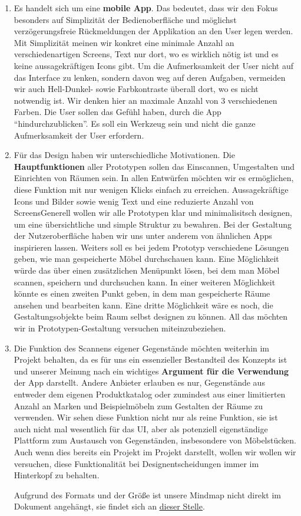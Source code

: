 \documentclass[12pt,paper=a4,oneside,hidelinks,headings=small,captions=heading,captions=nooneline]{scrartcl}
\begin{document}
\begin{enumerate}
\item Es handelt sich um eine \textbf{mobile App}. Das bedeutet, dass wir den
Fokus besonders auf Simplizität der Bedienoberfläche und möglichst
verzögerungsfreie Rückmeldungen der Applikation an den User legen
werden. Mit Simplizität meinen wir konkret eine minimale Anzahl an
verschiedenartigen Screens, Text nur dort, wo es wirklich nötig ist
und es keine aussagekräftigen Icons gibt. Um die Aufmerksamkeit der
User nicht auf das Interface zu lenken, sondern davon weg auf deren
Aufgaben, vermeiden wir auch Hell-Dunkel- sowie Farbkontraste
überall dort, wo es nicht notwendig ist. Wir denken hier an
maximale Anzahl von 3 verschiedenen Farben. Die User sollen das
Gefühl haben, durch die App "`hindurchzublicken"'. Es soll ein
Werkzeug sein und nicht die ganze Aufmerksamkeit der User
erfordern.
\item Für das Design haben wir unterschiedliche Motivationen. Die
\textbf{Hauptfunktionen} aller Prototypen sollen das Einscannen,
Umgestalten und Einrichten von Räumen sein. In allen Entwürfen
möchten wir es ermöglichen, diese Funktion mit nur wenigen Klicks
einfach zu erreichen. Aussagekräftige Icons und Bilder sowie wenig
Text und eine reduzierte Anzahl von ScreensGenerell wollen wir
alle Prototypen klar und minimalisitsch designen, um eine
übersichtliche und simple Struktur zu bewahren. Bei der Gestaltung
der Nutzeroberfläche haben wir uns unter anderem von ähnlichen Apps
inspirieren lassen. Weiters soll es bei jedem Prototyp verschiedene
Lösungen geben, wie man gespeicherte Möbel durchschauen kann. Eine
Möglichkeit würde das über einen zusätzlichen Menüpunkt lösen, bei
dem man Möbel scannen, speichern und durchsuchen kann. In einer
weiteren Möglichkeit könnte es einen zweiten Punkt geben, in dem
man gespeicherte Räume ansehen und bearbeiten kann. Eine dritte
Möglichkeit wäre es noch, die Gestaltungsobjekte beim Raum selbst
designen zu können. All das möchten wir in Prototypen-Gestaltung
versuchen miteinzubeziehen.
\item Die Funktion des Scannens eigener Gegenstände möchten weiterhin im
Projekt behalten, da es für uns ein essenzieller Bestandteil des
Konzepts ist und unserer Meinung nach ein wichtiges \textbf{Argument für
die Verwendung} der App darstellt. Andere Anbieter erlauben es nur,
Gegenstände aus entweder dem eigenen Produktkatalog oder zumindest
aus einer limitierten Anzahl an Marken und Beispielmöbeln zum
Gestalten der Räume zu verwenden. Wir sehen diese Funktion nicht
nur als reine Funktion, sie ist auch nicht mal wesentlich für das
UI, aber als potenziell eigenständige Plattform zum Austausch von
Gegenständen, insbesondere von Möbelstücken. Auch wenn dies bereits
ein Projekt im Projekt darstellt, wollen wir wollen wir versuchen,
diese Funktionalität bei Designentscheidungen immer im Hinterkopf
zu behalten.

Aufgrund des Formats und der Größe ist unsere Mindmap nicht direkt
im Dokument angehängt, sie findet sich an \uline{\href{https://dominikpegler.github.io/interior-designer/img/mindmap.png}{dieser Stelle}}.
\end{enumerate}
\end{document}
